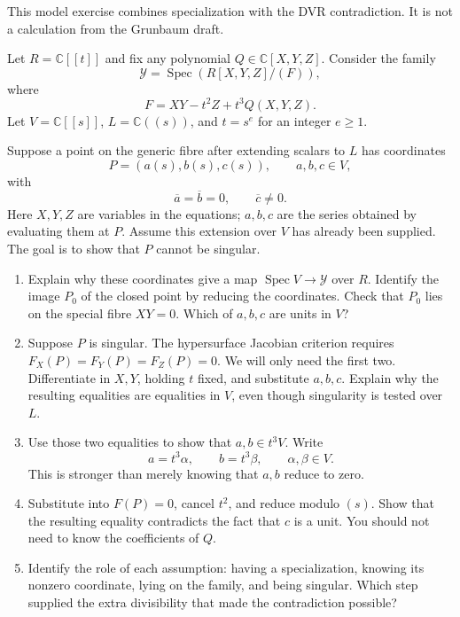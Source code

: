 \begin{exercise}
\label{exercise-singular-point-dvr-bridge}
This model exercise combines
specialization with the DVR
contradiction. It is not a calculation
from the Grunbaum draft.

Let $R=\mathbb{C}[[t]]$ and fix any
polynomial $Q\in\mathbb{C}[X,Y,Z]$.
Consider the family
$$
\mathcal{Y}=\operatorname{Spec}
(R[X,Y,Z]/(F)),
$$
where
$$
F=XY-t^2Z+t^3Q(X,Y,Z).
$$
Let $V=\mathbb{C}[[s]]$,
$L=\mathbb{C}((s))$, and $t=s^e$
for an integer $e\geq1$.

Suppose a point on the generic fibre
after extending scalars to $L$ has
coordinates
$$
P=(a(s),b(s),c(s)),\qquad a,b,c\in V,
$$
with
$$
\overline{a}=\overline{b}=0,\qquad
\overline{c}\neq0.
$$
Here $X,Y,Z$ are variables in the
equations; $a,b,c$ are the series
obtained by evaluating them at $P$.
Assume this extension over $V$ has
already been supplied. The goal is
to show that $P$ cannot be singular.

\begin{enumerate}
\item Explain why these coordinates
give a map
$\operatorname{Spec}V\to\mathcal{Y}$
over $R$. Identify the image $P_0$
of the closed point by reducing the
coordinates. Check that $P_0$ lies
on the special fibre $XY=0$.
Which of $a,b,c$ are units in $V$?

\item Suppose $P$ is singular.
The hypersurface Jacobian criterion
requires $F_X(P)=F_Y(P)=F_Z(P)=0$.
We will only need the first two.
Differentiate in $X,Y$, holding $t$
fixed, and substitute $a,b,c$.
Explain why the resulting equalities
are equalities in $V$, even though
singularity is tested over $L$.

\item Use those two equalities to show
that $a,b\in t^3V$. Write
$$
a=t^3\alpha,\qquad b=t^3\beta,
\qquad \alpha,\beta\in V.
$$
This is stronger than merely knowing
that $a,b$ reduce to zero.

\item Substitute into $F(P)=0$,
cancel $t^2$, and reduce modulo $(s)$.
Show that the resulting equality
contradicts the fact that $c$ is
a unit. You should not need to know
the coefficients of $Q$.

\item Identify the role of each
assumption: having a specialization,
knowing its nonzero coordinate,
lying on the family, and being
singular. Which step supplied the
extra divisibility that made the
contradiction possible?
\end{enumerate}
\end{exercise}

